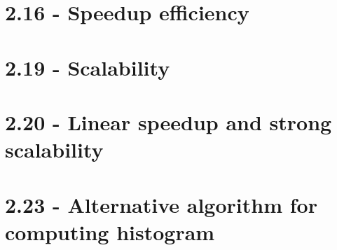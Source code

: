 \documentclass[a4paper,11pt,twoside]{article}
\begin{document}
    
\section{2.16 - Speedup efficiency}
\section{2.19 - Scalability}
\section{2.20 - Linear speedup and strong scalability}
\section{2.23 - Alternative algorithm for computing histogram}

\end{document}
